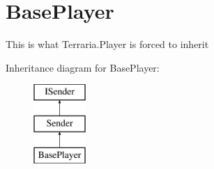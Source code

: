 \hypertarget{classOTA_1_1BasePlayer}{}\section{Base\+Player}
\label{classOTA_1_1BasePlayer}


This is what Terraria.\+Player is forced to inherit  


Inheritance diagram for Base\+Player\+:\begin{figure}[H]
\begin{center}
\leavevmode
\includegraphics[height=3.000000cm]{classOTA_1_1BasePlayer}
\end{center}
\end{figure}
